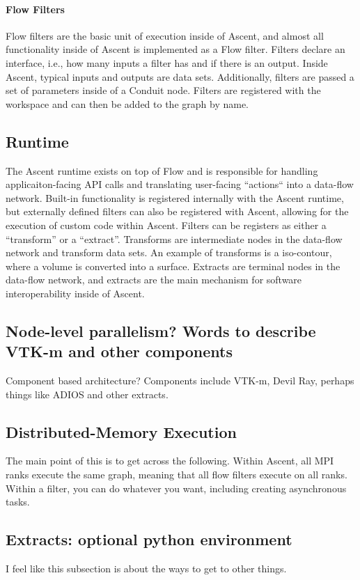 \paragraph{Flow Filters}
Flow filters are the basic unit of execution inside of Ascent, and
almost all functionality inside of Ascent is implemented as a Flow filter.
%
Filters declare an interface, i.e., how many inputs a filter has and
if there is an output.
%
Inside Ascent, typical inputs and outputs are data sets.
%
Additionally, filters are passed a set of parameters inside of a Conduit
node.
%
Filters are registered with the workspace and can then be added to the
graph by name.


\subsection{Runtime}
The Ascent runtime exists on top of Flow and is responsible for
handling applicaiton-facing API calls and translating user-facing
``actions`` into a data-flow network.
%
Built-in functionality is registered internally with the Ascent runtime,
but externally defined filters can also be registered with Ascent,
allowing for the execution of custom code within Ascent.
%
Filters can be registers as either a ``transform'' or a ``extract''.
%
Transforms are intermediate nodes in the data-flow network and transform
data sets.
%
An example of transforms is a iso-contour, where a volume is converted
into a surface.
%
Extracts are terminal nodes in the data-flow network, and extracts
are the main mechanism for software interoperability inside of Ascent.

\subsection{Node-level parallelism? Words to describe VTK-m and other components}

Component based architecture? Components include VTK-m, Devil Ray, perhaps things like ADIOS and other extracts.

\subsection{Distributed-Memory Execution}
The main point of this is to get across the following.
Within Ascent, all MPI ranks execute the same graph, meaning
that all flow filters execute on all ranks.
%
Within a filter, you can do whatever you want, including creating asynchronous
tasks.
%

\subsection{Extracts: optional python environment}
I feel like this subsection is about the ways to get to other things.
